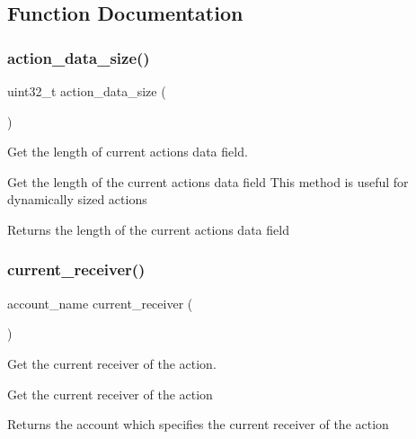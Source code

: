 \subsection{Function Documentation}
\mbox{\label{group__actioncapi_ga9d5497faab78ecdc03052cf644d72a5e}} 
\subsubsection{\texorpdfstring{action\+\_\+data\+\_\+size()}{action\_data\_size()}}
{\footnotesize\ttfamily uint32\+\_\+t action\+\_\+data\+\_\+size (\begin{DoxyParamCaption}{ }\end{DoxyParamCaption})}



Get the length of current action\textquotesingle{}s data field. 

Get the length of the current action\textquotesingle{}s data field This method is useful for dynamically sized actions \begin{DoxyReturn}{Returns}
the length of the current action\textquotesingle{}s data field 
\end{DoxyReturn}
\mbox{\label{group__actioncapi_ga5fcca014b53b0f15b9f9636325bae976}} 
\subsubsection{\texorpdfstring{current\+\_\+receiver()}{current\_receiver()}}
{\footnotesize\ttfamily account\+\_\+name current\+\_\+receiver (\begin{DoxyParamCaption}{ }\end{DoxyParamCaption})}



Get the current receiver of the action. 

Get the current receiver of the action \begin{DoxyReturn}{Returns}
the account which specifies the current receiver of the action 
\end{DoxyReturn}
\mbox{\label{group__actioncapi_gaf531fda07a825ca8b0d90f21446e6a64}} 
